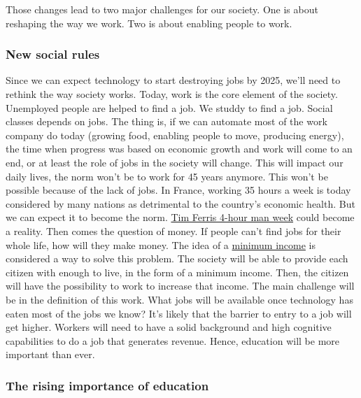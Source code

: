\documentclass[12pt]{article}
\begin{document}
Those changes lead to two major challenges for our society. One is about
reshaping the way we work. Two is about enabling people to work.

\subsubsection{New social rules}

Since we can expect technology to start destroying jobs by 2025, we'll need to
rethink the way society works. Today, work is the core element of the society.
Unemployed people are helped to find a job. We studdy to find a job. Social
classes depends on jobs.
The thing is, if we can automate most of the work company do today (growing food,
enabling people to move, producing energy), the time when progress was based on
economic growth and work will come to an end, or at least the role of jobs in
the society will change.
This will impact our daily lives, the norm won't be to work for 45 years anymore.
This won't be possible because of the lack of jobs. In France, working 35 hours
a week is today considered by many nations as detrimental to the country's economic
health. But we can expect it to become the norm. \href{http://fourhourworkweek.com/}
{Tim Ferris 4-hour man week} could become a reality.
Then comes the question of money. If people can't find jobs for their whole life,
how will they make money. The idea of a
\href{http://www.globalresearch.ca/an-unconditional-citizens-income-a-basic-guaranteed-minimum-income/5423130}
{minimum income} is considered a way to solve this problem. The society will be
able to provide each citizen with enough to live, in the form of a minimum income.
Then, the citizen will have the possibility to work to increase that income.
The main challenge will be in the definition of this work. What jobs will be
available once technology has eaten most of the jobs we know? It's likely that
the barrier to entry to a job will get higher. Workers will need to have a solid
background and high cognitive capabilities to do a job that generates revenue.
Hence, education will be more important than ever.

\subsubsection{The rising importance of education}
\end{document}
